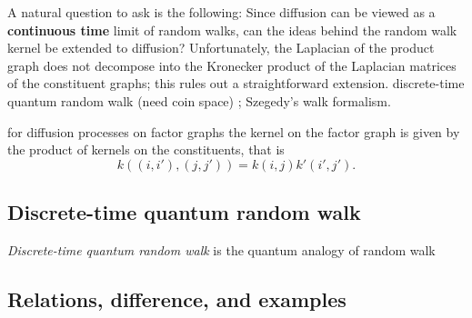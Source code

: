 \begin{remark}
	A natural question to ask is the following: Since diffusion can be viewed as a \textbf{continuous time} limit of random walks, can the ideas behind the random walk kernel be extended to diffusion? Unfortunately, the Laplacian of the product graph does not decompose into the Kronecker product of the Laplacian matrices of the constituent graphs; this rules out a straightforward extension.
	discrete-time quantum random walk (need coin space) \cite{ambainisCoinsMakeQuantum2005} \cite{childsQuantumInformationProcessing2004};
	Szegedy's walk formalism.
	\cite{szegedySpectraQuantizedWalks2004}
\end{remark}
\begin{remark}
	for diﬀusion processes on factor graphs the kernel on the factor graph is given by the product of kernels on the constituents, that is 
	\begin{equation}
		k((i, i'), (j, j')) = k(i, j) k' (i' , j' ).
	\end{equation}
\end{remark}

\subsection{Discrete-time quantum random walk}
\emph{Discrete-time quantum random walk} is the quantum analogy of random walk

\subsection{Relations, difference, and examples}
